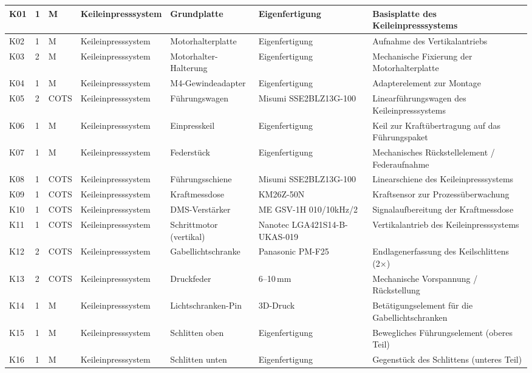 \begin{landscape}
{\begin{longtable}{|l|l|l|l|l|p{4.6cm}|p{6.5cm}|}
K01 & 1 & M & Keileinpresssystem & Grundplatte & Eigenfertigung & Basisplatte des Keileinpresssystems \\
\hline
K02 & 1 & M & Keileinpresssystem & Motorhalterplatte & Eigenfertigung & Aufnahme des Vertikalantriebs \\
\hline
K03 & 2 & M & Keileinpresssystem & Motorhalter-Halterung & Eigenfertigung & Mechanische Fixierung der Motorhalterplatte \\
\hline
K04 & 1 & M & Keileinpresssystem & M4-Gewindeadapter & Eigenfertigung & Adapterelement zur Montage \\
\hline
K05 & 2 & COTS & Keileinpresssystem & Führungswagen & Misumi SSE2BLZ13G-100 & Linearführungswagen des Keileinpresssystems \\
\hline
K06 & 1 & M & Keileinpresssystem & Einpresskeil & Eigenfertigung & Keil zur Kraftübertragung auf das Führungspaket \\
\hline
K07 & 1 & M & Keileinpresssystem & Federstück & Eigenfertigung & Mechanisches Rückstellelement / Federaufnahme \\
\hline
K08 & 1 & COTS & Keileinpresssystem & Führungsschiene & Misumi SSE2BLZ13G-100 & Linearschiene des Keileinpresssystems \\
\hline
K09 & 1 & COTS & Keileinpresssystem & Kraftmessdose & KM26Z-50N & Kraftsensor zur Prozessüberwachung \\
\hline
K10 & 1 & COTS & Keileinpresssystem & DMS-Verstärker & ME GSV-1H 010/10kHz/2 & Signalaufbereitung der Kraftmessdose \\
\hline
K11 & 1 & COTS & Keileinpresssystem & Schrittmotor (vertikal) & Nanotec LGA421S14-B-UKAS-019 & Vertikalantrieb des Keileinpresssystems \\
\hline
K12 & 2 & COTS & Keileinpresssystem & Gabellichtschranke & Panasonic PM-F25 & Endlagenerfassung des Keilschlittens (2×) \\
\hline
K13 & 2 & COTS & Keileinpresssystem & Druckfeder & 6--10\,mm & Mechanische Vorspannung / Rückstellung \\
\hline
K14 & 1 & M & Keileinpresssystem & Lichtschranken-Pin & 3D-Druck & Betätigungselement für die Gabellichtschranken \\
\hline
K15 & 1 & M & Keileinpresssystem & Schlitten oben & Eigenfertigung & Bewegliches Führungselement (oberes Teil) \\
\hline
K16 & 1 & M & Keileinpresssystem & Schlitten unten & Eigenfertigung & Gegenstück des Schlittens (unteres Teil) \\

\end{longtable}}
\end{landscape}
